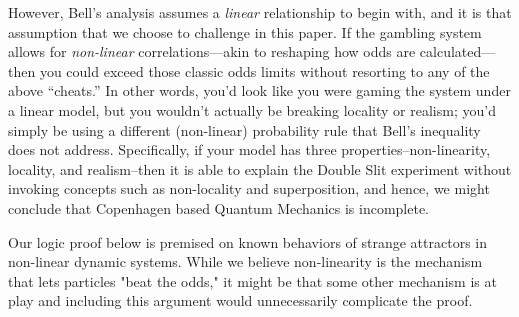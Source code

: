 \documentclass{article}
\begin{document}
However, Bell’s analysis assumes a \textit{linear} relationship to begin with, and it is that assumption that we choose to challenge in this paper. If the gambling system allows for \textit{non-linear} correlations—akin to reshaping how odds are calculated—then you could exceed those classic odds limits without resorting to any of the above “cheats.” In other words, you’d look like you were gaming the system under a linear model, but you wouldn’t actually be breaking locality or realism; you’d simply be using a different (non-linear) probability rule that Bell’s inequality does not address. Specifically, if your model has three properties--non-linearity, locality, and realism--then it is able to explain the Double Slit experiment without invoking concepts such as non-locality and superposition, and hence, we might conclude that Copenhagen based Quantum Mechanics is incomplete. 

Our logic proof below is premised on known behaviors of strange attractors in non-linear dynamic systems. While we believe non-linearity is the mechanism that lets particles "beat the odds," it might be that some other mechanism is at play and including this argument would unnecessarily complicate the proof.
\end{document}
